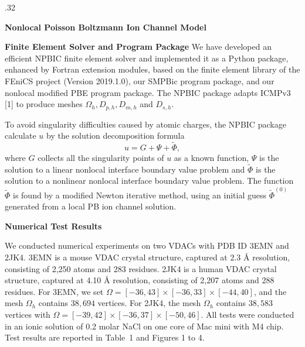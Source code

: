\documentclass[10pt]{beamer}
\newcommand{\Phit}{\tilde{\Phi}}
\begin{document}
\begin{frame}{}
\begin{columns}[t]
\begin{column}{.32\linewidth}
\begin{block}{\centering \bf \large Nonlocal Poisson Boltzmann Ion Channel Model}
                \end{block}
                \vspace{2mm}
                \begin{block}{\centering \bf \large Finite Element Solver and Program Package}
                    We have developed an efficient NPBIC finite element solver and implemented it as a Python package, enhanced by Fortran extension modules, based on the finite element library of the FEniCS project (Version 2019.1.0), our SMPBic program package, and our nonlocal modified PBE program package. The NPBIC package adapts ICMPv3 [1] to produce meshes $\Omega_h, D_{p, h}, D_{m, h}$ and $D_{s, h}$. 

                    \vspace{0.3em}
                    To avoid singularity difficulties caused by atomic charges, the NPBIC package calculate $u$ by the solution decomposition formula 
                    \[ u = G  + \Psi + \Phit,\]
                    where $G$ collects all the singularity points of $u$ as a known function, $\Psi$ is the solution to a linear nonlocal interface boundary value problem and $\Phit$ is the solution to a nonlinear nonlocal interface boundary value problem. The function $\Phit$ is found by a modified Newton iterative method, using an initial guess $\Phit^{(0)}$ generated from a local PB ion channel solution. 
                \end{block}
                \vspace{2mm}
                \begin{block}{\centering \bf \large Numerical Test Results}
                
                 We conducted numerical experiments on two VDACs with PDB ID 3EMN and 2JK4. 3EMN is a mouse VDAC crystal structure, captured at 2.3 {\AA} resolution, consisting of 2,250 atoms and 283 residues. 2JK4 is a human VDAC crystal structure, captured at 4.10 {\AA} resolution, consisting of 2,207 atoms and 288 residues. For 3EMN, we set $\Omega = [-36, 43] \times [-36, 33] \times [-44, 40]$, and the mesh $\Omega_h$ contains $38,694$ vertices. For 2JK4, the mesh $\Omega_h$ contains $38,583$ vertices with $\Omega = [-39, 42] \times [-36, 37] \times [-50, 46]$. All tests were conducted in an ionic solution of 0.2 molar NaCl on one core of Mac mini with M4 chip. Test results are reported in Table~1 and Figures 1 to 4.


\end{block}
\end{column}
\end{columns}
\end{frame}
\end{document}
